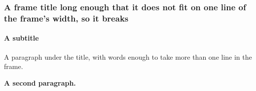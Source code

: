 \documentclass[10pt]{beamer}
\begin{document}
\begin{frame}[t]
\frametitle[Short]{A frame title long enough that it does not fit on one line of the frame's width, so it breaks}
\framesubtitle{A subtitle}
A paragraph under the title, with words enough to take more than one line in the frame.

\textbf{A second paragraph.}
\end{frame}
\end{document}
